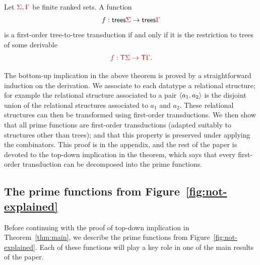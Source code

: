 


\begin{theorem}\label{thm:main}
    Let ${\color{red}{\Sigma}},{\color{red}{\Gamma}}$ be finite ranked sets. A function 
    \begin{align*}
        f : \mathsf {trees} {\color{red}{\Sigma}} \to \mathsf {trees} {\color{red}{\Gamma}}
    \end{align*}
    is a first-order tree-to-tree transduction if and only if it is the restriction to trees of some derivable
    \begin{align*}
        {\color{red}{f : {\color{red}{\mathsf T}}\Sigma \to {\color{red}{\mathsf T}}\Gamma}}.
    \end{align*}
    
\end{theorem}

The bottom-up implication in the above theorem is proved by a straightforward induction on the derivation. We associate to each datatype a relational structure; for example the relational structure associated to a pair $\langle{a_1,a_2}\rangle$ is the disjoint union of the relational structures associated to $a_1$ and $a_2$. These relational structures can then be transformed using first-order transductions.   We then show that all prime functions are first-order transductions (adapted suitably to structures other than trees); and that this property is preserved under applying the combinators.  This proof is in the appendix, and the rest of the paper is devoted to the top-down implication in the theorem, which says that every first-order transduction can be decomposed into the prime functions.


%
\subsection{The prime functions from Figure~\ref{fig:not-explained}}
\label{sec:prime-and-combinators}
Before continuing with the proof of top-down implication in Theorem~\ref{thm:main}, we  describe the prime functions from Figure~\ref{fig:not-explained}. 
Each of these functions will play a key role in one of the main results of the paper.


